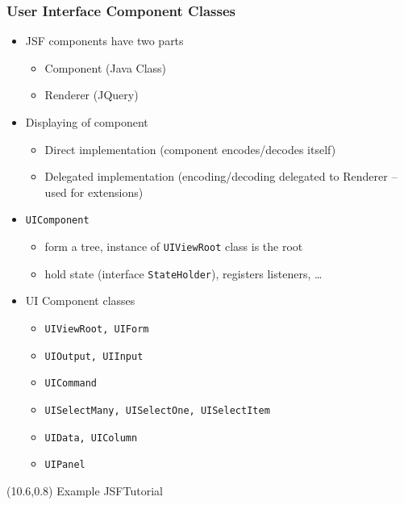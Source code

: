 \documentclass[10pt,xcolor=pdflatex]{beamer}
\begin{document}
\begin{frame}\frametitle{User Interface Component Classes}
	\begin{itemize}
      \item JSF components have two parts
        \begin{itemize}
        	\item Component (Java Class)
            \item Renderer (JQuery)
        \end{itemize}
      \item Displaying of component
        \begin{itemize}
        	\item Direct implementation (component encodes/decodes itself)
            \item Delegated implementation (encoding/decoding delegated to Renderer -- used for extensions)
        \end{itemize}
      \item \texttt{UIComponent}
        \begin{itemize}
        	\item form a tree, instance of \texttt{UIViewRoot} class is the root
        	\item hold state (interface \texttt{StateHolder}), registers listeners, \ldots
        \end{itemize}
      \item UI Component classes
        \begin{itemize}
        	\item \texttt{UIViewRoot, UIForm}
        	\item \texttt{UIOutput, UIInput}
        	\item \texttt{UICommand}
        	\item \texttt{UISelectMany, UISelectOne, UISelectItem}
        	\item \texttt{UIData, UIColumn}
        	\item \texttt{UIPanel}
        \end{itemize}
	\end{itemize}
\begin{textblock}{15}(10.6,0.8)
    {\footnotesize Example JSFTutorial}
\end{textblock}
\end{frame}
\end{document}
